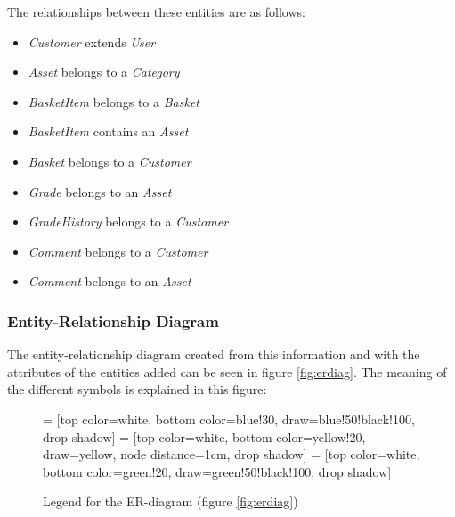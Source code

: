 \documentclass[12pt, a4paper,titlepage]{article}
\begin{document}
The relationships between these entities are as follows:
\begin{itemize}
\setlength\itemsep{-7pt}
\item \emph{Customer} extends \emph{User}
\item \emph{Asset} belongs to a \emph{Category}
\item \emph{BasketItem} belongs to a \emph{Basket}
\item \emph{BasketItem} contains an \emph{Asset}
\item \emph{Basket} belongs to a \emph{Customer}
\item \emph{Grade} belongs to an \emph{Asset}
\item \emph{GradeHistory} belongs to a \emph{Customer}
\item \emph{Comment} belongs to a \emph{Customer}
\item \emph{Comment} belongs to an \emph{Asset}
\end{itemize}

\subsubsection{Entity-Relationship Diagram}
The entity-relationship diagram created from this information and with the
attributes of the entities added can be seen in figure \ref{fig:erdiag}. 
The meaning of the different symbols is explained in this figure:
\begin{figure}[H]
\centering
{} = [top color=white, bottom color=blue!30, 
                            draw=blue!50!black!100, drop shadow]
 = [top color=white, bottom color=yellow!20, 
                               draw=yellow, node distance=1cm, drop shadow]
 = [top color=white, bottom color=green!20, 
                                  draw=green!50!black!100, drop shadow]
\caption{Legend for the ER-diagram (figure \ref{fig:erdiag})}
\end{figure}
\end{document}
